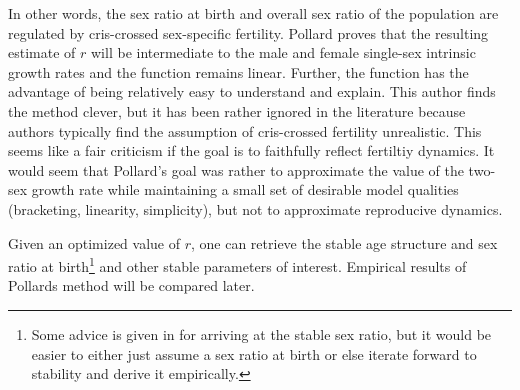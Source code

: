 In other words, the sex ratio at birth and overall sex ratio of the population
are regulated by cris-crossed sex-specific fertility. Pollard proves that
the resulting estimate of $r$ will be intermediate to the male and female
single-sex intrinsic growth rates and the function remains linear. Further, the
function has the advantage of being relatively easy to understand and explain.
This author finds the method clever, but it has been rather ignored in the
literature because authors typically find the assumption of cris-crossed
fertility unrealistic. This seems like a fair criticism if the goal is to
faithfully reflect fertiltiy dynamics. It would seem that Pollard's goal was
rather to approximate the value of the two-sex growth rate while maintaining
a small set of desirable model qualities (bracketing, linearity,
simplicity), but not to approximate reproducive dynamics. 

Given an optimized value of $r$, one can retrieve the stable age structure and
sex ratio at birth\footnote{Some advice is given in
\citet{pollard1948measurement} for arriving at the stable sex ratio, but it
would be easier to either just assume a sex ratio at birth or else iterate
forward to stability and derive it empirically.} and other stable parameters of
interest. Empirical results of Pollards method will be compared later.